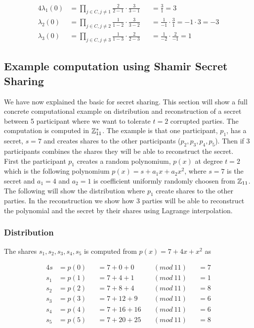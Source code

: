 \noindent
\begin{alignat*}{4}
\lambda_1(0) &=\prod\limits_{j\in C,j\neq 1} \frac{2}{2-1}  \cdot  \frac{3}{3-1} &&=\frac{3}{1} = 3 \\
\lambda_2(0) &=\prod\limits_{j\in C,j\neq 2} \frac{1}{1-2}  \cdot  \frac{3}{3-2} &&=\frac{1}{-1} \cdot  \frac{3}{1} =-1 \cdot  3=-3 \\
\lambda_3(0) &=\prod\limits_{j\in C,j\neq 3} \frac{1}{1-3}  \cdot  \frac{2}{2-3} &&=\frac{1}{-2} \cdot  \frac{2}{-1} =1  
\end{alignat*}




 \subsection{Example computation using Shamir Secret Sharing}
  \label{sec:example_computation_using_shamir_secret_sharing}
We have now explained the basic for secret sharing. This section will show a full concrete computational example on distribution and reconstruction of a secret between 5 participant where we want to tolerate $t=2$ corrupted parties. The computation is computed in $\mathbb{Z}_{11}^*$. The example is that one participant, $p_1$, has a secret, $s=7$ and creates shares to the other participants ($p_2, p_3, p_4, p_5$). Then if $3$ participants combines the shares they will be able to reconstruct the secret. \\

\noindent
First the participant $p_1$ creates a random polynomium, $p(x)$ at degree $t=2$ which is the following polynomium $p(x)=s + a_{1}x+ a_{2}x^2$, where $s=7$ is the secret and $a_{1}=4$ and $a_{2}=1$ is coefficient uniformly randomly choosen from $\mathbb{Z}_{11}$. The following will show the distribution where $p_1$ create shares to the other parties. In the reconstruction we show how $3$ parties will be able to reconstruct the polynomial and the secret by their shares using Lagrange interpolation.   

\subsubsection{Distribution}
The shares $s_1, s_2, s_3, s_4,s_5$ is computed from $p(x)=7 + 4x+ x^2$ as

\noindent
\begin{alignat*}{4}
s&=p(0)&&= 7+0+0 \ &&(mod \ 11) &&=7 \\
s_1&=p(1)&&= 7+4+1 \ &&(mod \ 11) &&=1 \\
s_2&=p(2)&&= 7+8+4 \ &&(mod \ 11) &&=8 \\
s_3&=p(3)&&= 7+12+9 \ &&(mod \ 11) &&=6 \\
s_4&=p(4)&&= 7+16+16 \ &&(mod \ 11) &&=6 \\
s_5&=p(5)&&= 7+20+25 \ &&(mod \ 11) &&=8    
\end{alignat*}


